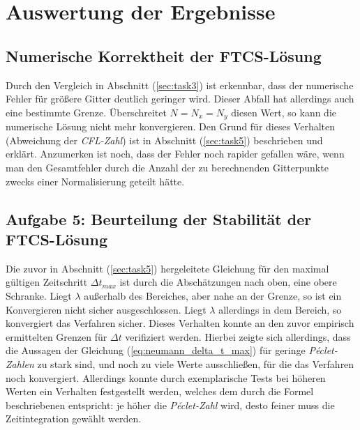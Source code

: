 \documentclass[12pt,a4paper,titlepage,headinclude,bibtotoc]{scrartcl}
\begin{document}
\hfill%

\section{Auswertung der Ergebnisse}
\label{sec:interpretation}
\subsection{Numerische Korrektheit der FTCS-Lösung}
\label{sec:disc_num_corr}
Durch den Vergleich in Abschnitt (\ref{sec:task3}) ist erkennbar, dass der numerische Fehler für größere Gitter deutlich geringer wird. Dieser Abfall hat allerdings auch eine bestimmte Grenze. Überschreitet $N = N_x = N_y$ diesen Wert, so kann die numerische Lösung nicht mehr konvergieren. Den Grund für dieses Verhalten (Abweichung der \textit{CFL-Zahl}) ist in Abschnitt (\ref{sec:task5}) beschrieben und erklärt. Anzumerken ist noch, dass der Fehler noch rapider gefallen wäre, wenn man den Gesamtfehler durch die Anzahl der zu berechnenden Gitterpunkte zwecks einer Normalisierung geteilt hätte.

\subsection{Aufgabe 5: Beurteilung der Stabilität der FTCS-Lösung}
\label{sec:disc_stability}
Die zuvor in Abschnitt (\ref{sec:task5}) hergeleitete Gleichung für den maximal gültigen Zeitschritt $\Delta t_{max}$ ist durch die Abschätzungen nach oben, eine obere Schranke. Liegt $\lambda$ außerhalb des Bereiches, aber nahe an der Grenze, so ist ein Konvergieren nicht sicher ausgeschlossen. Liegt $\lambda$ allerdings in dem Bereich, so konvergiert das Verfahren sicher. Dieses Verhalten konnte an den zuvor empirisch ermittelten Grenzen für $\Delta t$ verifiziert werden. Hierbei zeigte sich allerdings, dass die Aussagen der Gleichung (\ref{eq:neumann_delta_t_max}) für geringe \textit{Péclet-Zahlen} zu stark sind, und noch zu viele Werte ausschließen, für die das Verfahren noch konvergiert. Allerdings konnte durch exemplarische Tests bei höheren Werten ein Verhalten festgestellt werden, welches dem durch die Formel beschriebenen entspricht: je höher die \textit{Péclet-Zahl} wird, desto feiner muss die Zeitintegration gewählt werden.
\end{document}
